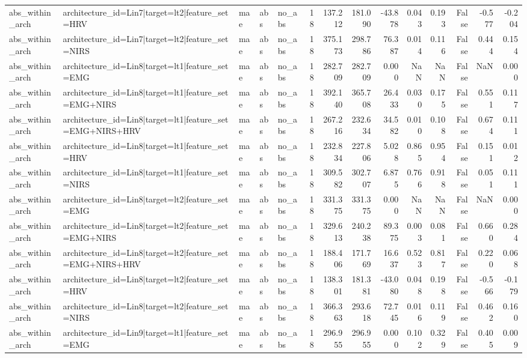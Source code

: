 \begin{table}
\begin{tabular}{lllllrrrrrrrrr}
abs_within_arch & architecture_id=Lin7|target=lt2|feature_set=HRV & mae & abs & no_abs & 18 & 137.212 & 181.090 & -43.878 & 0.043 & 0.193 & False & -0.577 & -0.204 \\
abs_within_arch & architecture_id=Lin7|target=lt2|feature_set=NIRS & mae & abs & no_abs & 18 & 375.173 & 298.786 & 76.387 & 0.014 & 0.116 & False & 0.444 & 0.154 \\
abs_within_arch & architecture_id=Lin8|target=lt1|feature_set=EMG & mae & abs & no_abs & 18 & 282.709 & 282.709 & 0.000 & NaN & NaN & False & NaN & 0.000 \\
abs_within_arch & architecture_id=Lin8|target=lt1|feature_set=EMG+NIRS & mae & abs & no_abs & 18 & 392.140 & 365.708 & 26.433 & 0.030 & 0.175 & False & 0.551 & 0.117 \\
abs_within_arch & architecture_id=Lin8|target=lt1|feature_set=EMG+NIRS+HRV & mae & abs & no_abs & 18 & 267.216 & 232.634 & 34.582 & 0.010 & 0.108 & False & 0.674 & 0.111 \\
abs_within_arch & architecture_id=Lin8|target=lt1|feature_set=HRV & mae & abs & no_abs & 18 & 232.834 & 227.806 & 5.028 & 0.865 & 0.954 & False & 0.151 & 0.012 \\
abs_within_arch & architecture_id=Lin8|target=lt1|feature_set=NIRS & mae & abs & no_abs & 18 & 309.582 & 302.707 & 6.875 & 0.766 & 0.918 & False & 0.051 & 0.111 \\
abs_within_arch & architecture_id=Lin8|target=lt2|feature_set=EMG & mae & abs & no_abs & 18 & 331.375 & 331.375 & 0.000 & NaN & NaN & False & NaN & 0.000 \\
abs_within_arch & architecture_id=Lin8|target=lt2|feature_set=EMG+NIRS & mae & abs & no_abs & 18 & 329.613 & 240.238 & 89.375 & 0.003 & 0.081 & False & 0.660 & 0.284 \\
abs_within_arch & architecture_id=Lin8|target=lt2|feature_set=EMG+NIRS+HRV & mae & abs & no_abs & 18 & 188.406 & 171.769 & 16.637 & 0.523 & 0.817 & False & 0.220 & 0.068 \\
abs_within_arch & architecture_id=Lin8|target=lt2|feature_set=HRV & mae & abs & no_abs & 18 & 138.301 & 181.381 & -43.080 & 0.048 & 0.198 & False & -0.566 & -0.179 \\
abs_within_arch & architecture_id=Lin8|target=lt2|feature_set=NIRS & mae & abs & no_abs & 18 & 366.363 & 293.618 & 72.745 & 0.016 & 0.119 & False & 0.462 & 0.160 \\
abs_within_arch & architecture_id=Lin9|target=lt1|feature_set=EMG & mae & abs & no_abs & 18 & 296.955 & 296.955 & 0.000 & 0.102 & 0.329 & False & 0.405 & 0.009 \\

\end{tabular}
\end{table}

